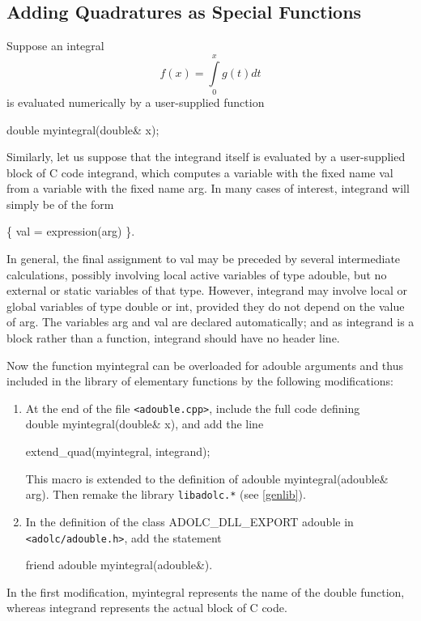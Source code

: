 \documentclass[11pt,twoside]{article}
\begin{document}
\subsection{Adding Quadratures as Special Functions}
%
\label{quadrat}
%
Suppose an integral 
\[ f(x) = \int\limits^{x}_{0} g(t) dt \]
is evaluated numerically by a user-supplied function 
\begin{center}
{\sf  double  myintegral(double\& x);}
\end{center}
Similarly, let us suppose that the integrand itself is evaluated by
a user-supplied block of C code {\sf integrand}, which computes a
variable with the fixed name {\sf val} from a variable with the fixed
name {\sf arg}. In many cases of interest, {\sf integrand} will
simply be of the form
\begin{center}
{\sf \{ val = expression(arg) \}}\enspace .
\end{center}
In general, the final assignment to {\sf val} may be preceded
by several intermediate calculations, possibly involving local 
active variables of type {\sf adouble}, but no external or static
variables of that type.  However, {\sf integrand} may involve local
or global variables of type {\sf double} or {\sf int}, provided they
do not depend on the value of {\sf arg}. The variables {\sf arg} and 
{\sf val} are declared automatically; and as {\sf integrand} is a block
rather than a function, {\sf integrand} should have no header line.  

Now the function {\sf myintegral} can be overloaded for {\sf adouble}
arguments and thus included in the library of elementary functions 
by the following modifications:
\begin{enumerate}
\item
At the end of the file \verb=<adouble.cpp>=, include the full code
defining \\ {\sf double myintegral(double\& x)}, and add the line
\begin{center}
{\sf extend\_quad(myintegral, integrand); }
\end{center}
This macro is extended to the definition of 
 {\sf adouble myintegral(adouble\& arg)}.
Then remake the library \verb=libadolc.*= (see \autoref{genlib}). 
\item
In the definition of the class
{\sf ADOLC\_DLL\_EXPORT adouble} in \verb=<adolc/adouble.h>=, add the statement
\begin{center}
{\sf friend adouble myintegral(adouble\&)}.
\end{center}
\end{enumerate}
In the first modification, {\sf myintegral} represents the name of the
{\sf double} function, whereas {\sf integrand} represents the actual block
of C code. 
\end{document}
